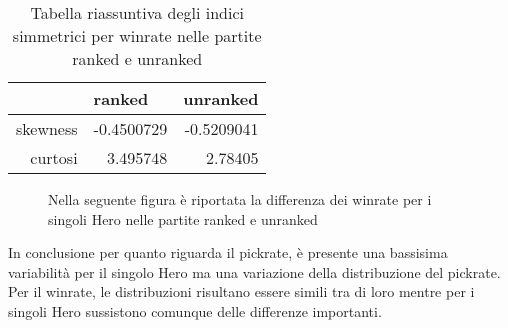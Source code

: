 \begin{table}
\centering
\caption{Tabella riassuntiva degli indici simmetrici per winrate nelle partite ranked e unranked}
\label{indici_simmetrici_winrate_sintetico}
\begin{tabular}{|r|r|r|}
\hline
\multicolumn{1}{|l|}{} & \multicolumn{1}{l|}{ranked} & \multicolumn{1}{l|}{unranked} \\ \hline
skewness    &  -0.4500729  &   -0.5209041     \\ \hline
curtosi     &  3.495748  &   2.78405     \\ \hline
\end{tabular}
\end{table}
\begin{figure}[htbp]
\begin{center}

\caption{Nella seguente figura è riportata la differenza dei winrate per i singoli Hero nelle partite ranked e unranked}
\label{differenza_winrate_ranked_unranked_sintetico}
\end{center}
\end{figure}
In conclusione per quanto riguarda il pickrate, è presente una bassisima variabilità per il singolo Hero ma una variazione della distribuzione del pickrate. Per il winrate, le distribuzioni risultano essere simili tra di loro mentre per i singoli Hero sussistono comunque delle differenze importanti.